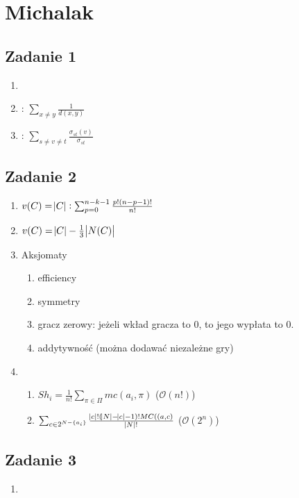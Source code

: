 \section{Michalak}

\subsection{Zadanie 1}
\begin{enumerate}
  \item
  \item
    :
        $\sum_{x\neq y}{\frac{1}{d(x,y)}}$
      \item
        :
        $\sum_{s\neq v \neq t} \frac{\sigma_{st}(v)}{\sigma_{st}}$

\end{enumerate}

\subsection{Zadanie 2}
\begin{enumerate}
  \item
    $v(C) = \abs{C}: \sum^{n - k - 1}_{p = 0} \frac{p! (n - p - 1)!}{n!}$
  \item
    $ v(C) = \abs{C} - \frac{1}{3} \abs{N(C)} $
  \item
    Aksjomaty
    \begin{enumerate}
      \item
        efficiency
      \item
        symmetry
      \item
        gracz zerowy: jeżeli wkład gracza to $0$, to jego wypłata to $0$.
      \item
        addytywność (można dodawać niezależne gry)
    \end{enumerate}
  \item
    \begin{enumerate}
      \item
        $Sh_i = \frac{1}{n!} \sum_{\pi \in \Pi} mc(a_i, \pi)$
        ($\mathcal{O}(n!)$)
      \item
        $\sum_{c\in 2^{N-\{a_i\}}} \frac{\abs{c}!(\abs{N} - \abs{c} -1)!MC((a,c)}{\abs{N}!}$
        ($\mathcal{O}(2^n)$)
    \end{enumerate}
\end{enumerate}

\subsection{Zadanie 3}
\begin{enumerate}
  \item
\end{enumerate}

